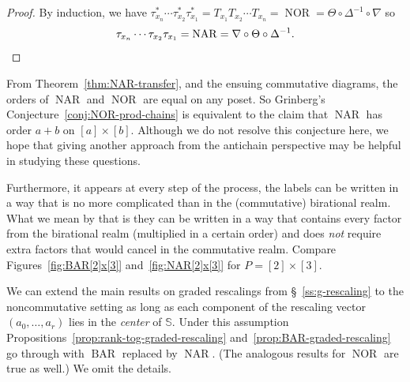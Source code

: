\documentclass[ALCO,ThmDefs,Unicode,epreuves]{cedram}
\newcommand{\defn}[1]{\emph{#1}}
\newcommand{\bbs}{\mathbb{S}}
\newcommand{\down}{\nabla}
\newcommand{\up}{\Delta}
\DeclareMathOperator{\BAR}{BAR}
\DeclareMathOperator{\NAR}{NAR}
\DeclareMathOperator{\NOR}{NOR}
\begin{document}
\begin{proof}
By induction, we have $\tau_{x_n}^*\cdots \tau_{x_2}^* \tau_{x_1}^* = T_{x_1} T_{x_2} \cdots T_{x_n} = \NOR = \Theta\circ\up^{-1}\circ \down$ so
\[
\tau_{x_n}\cdots \tau_{x_2} \tau_{x_1} = \NAR
=\down\circ\Theta\circ\up^{-1}.\qedhere
\]
\end{proof}

From Theorem~\ref{thm:NAR-transfer}, and the ensuing commutative diagrams, the orders of $\NAR$ and $\NOR$ are equal on any poset. So Grinberg's Conjecture~\ref{conj:NOR-prod-chains}
is equivalent to the claim that $\NAR$ has order $a+b$ on
$[a]\times[b]$. Although we do not resolve this conjecture here, we hope that giving another approach from the antichain perspective may be helpful in studying these questions. 

Furthermore, it appears at every step of the process, the labels can be written in a way that is no more complicated than in the (commutative) birational realm. What we mean by that is they can be written in a way that contains every factor from the birational realm (multiplied in a certain order) and does \defn{not} require extra factors that would cancel in the commutative realm.
Compare Figures~\ref{fig:BAR[2]x[3]} and~\ref{fig:NAR[2]x[3]} for $P=[2]\times[3]$.

We can extend the main results on graded rescalings from \S~\ref{ss:g-rescaling} to the
noncommutative setting as long as each component of the rescaling vector $(a_{0},\dots ,a_{r})$
lies in the \emph{center} of $\bbs$. Under this assumption
Propositions~\ref{prop:rank-tog-graded-rescaling} and~\ref{prop:BAR-graded-rescaling} go
through with $\BAR$ replaced by $\NAR$. (The analogous results for $\NOR$ are true as well.)
We omit the details. 




\end{document}
